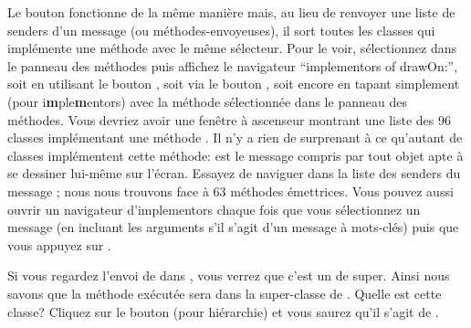 \documentclass[a4paper,10pt,twoside]{book}
\begin{document}
Le bouton  fonctionne de la m\^eme mani\`ere mais,
au lieu de renvoyer une liste de senders d'un message (ou m\'ethodes-envoyeuses), il sort toutes les
classes qui impl\'emente une m\'ethode avec le m\^eme s\'electeur.
Pour le voir, s\'electionnez  dans le panneau des m\'ethodes
puis affichez le navigateur ``implementors of drawOn:'', 
soit en utilisant le bouton , soit via le bouton 
, soit encore en tapant simplement  (pour {i\textbf{m}ple\textbf{m}entors}) avec la m\'ethode  s\'electionn\'ee dans le panneau des m\'ethodes. 
Vous devriez avoir une fen\^etre \`a ascenseur montrant une liste des 96
classes impl\'ementant une m\'ethode .
Il n'y a rien de surprenant \`a ce qu'autant de classes impl\'ementent cette
m\'ethode:  est le message compris par tout objet apte \`a se
dessiner lui-m\^eme sur l'\'ecran.
Essayez de naviguer dans la liste des senders du message ; nous nous trouvons face \`a 63 m\'ethodes \'emettrices. Vous pouvez aussi ouvrir
un navigateur d'implementors chaque fois que vous s\'electionnez un message
(en incluant les arguments s'il s'agit d'un message \`a mots-cl\'es) puis
que vous appuyez sur .


Si vous regardez l'envoi de  dans , vous
verrez que c'est un  de super. Ainsi nous
savons que la m\'ethode ex\'ecut\'ee sera dans la super-classe de . Quelle est cette classe? Cliquez sur le bouton  (pour hi\'erarchie) et vous saurez qu'il s'agit de .
\end{document}
